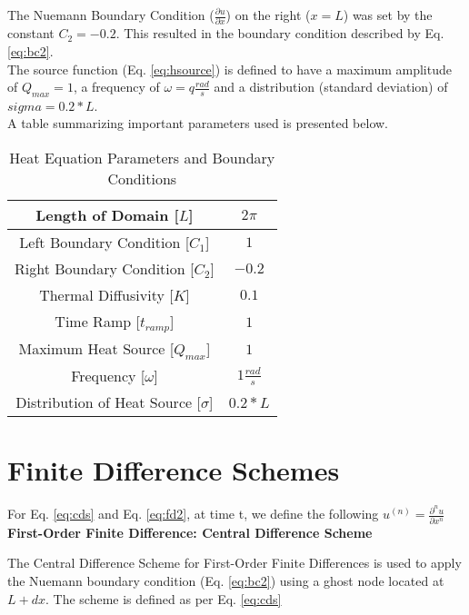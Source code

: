 \documentclass[10pt, letter, showtrims]{extarticle}
\begin{document}
		\noindent
		The Nuemann Boundary Condition ($\frac{\partial u}{\partial x}$) on the right ($x = L$) was set by the constant  $C_{2} = -0.2$. This resulted in the boundary condition described by Eq. \ref{eq:bc2}. \\
		
		\noindent
		The source function (Eq. \ref{eq:hsource}) is defined to have a maximum amplitude of $Q_{max} = 1$, a frequency of $\omega = q \frac{rad}{s}$ and a distribution (standard deviation) of $sigma = 0.2 * L$. \\		
		
		\noindent
		A table summarizing important parameters used is presented below. \\
		
		\begin{table}[h]
			\caption{Heat Equation Parameters and Boundary Conditions}
			\centering
			\begin{tabular}{|c|c|}
				\hline
				Length of Domain [$L$] & $2\pi$ \\
				\hline
				Left Boundary Condition [$C_{1}$] & $1$ \\
				\hline
				Right Boundary Condition [$C_{2}$] & $-0.2$ \\
				\hline
				Thermal Diffusivity [$K$] & $0.1$ \\
				\hline
				Time Ramp [$t_{ramp}$] & $1$ \\
				\hline
				Maximum Heat Source [$Q_{max}$] & $1$ \\
				\hline
				Frequency [$\omega$] & $1 \frac{rad}{s}$ \\
				\hline
				Distribution of Heat Source [$\sigma$] & $0.2 * L$ \\
				\hline
			\end{tabular}
		\end{table}
	
		\section{Finite Difference Schemes}
		
		\noindent
		For Eq. \ref{eq:cds} and Eq. \ref{eq:fd2}, at time t, we define the following $u^{(n)} = \frac{\partial^{n} u}{\partial x^{n}}$  \\
		
		\noindent
		\textbf{First-Order Finite Difference: Central Difference Scheme}
		
		\noindent
		The Central Difference Scheme for First-Order Finite Differences is used to apply the Nuemann boundary condition (Eq. \ref{eq:bc2}) using a ghost node located at $L + dx$. The scheme is defined as per Eq. \ref{eq:cds}
		
\end{document}
